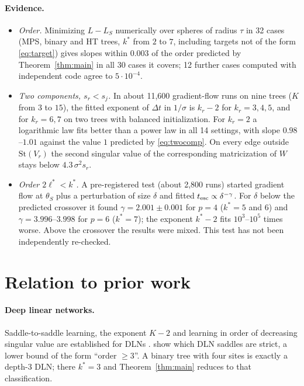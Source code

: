 \documentclass[11pt]{article}
\theoremstyle{definition}
\newcommand{\St}{\mathrm{St}}
\begin{document}
\paragraph{Evidence.}
\begin{itemize}
\item \emph{Order.} Minimizing $L-L_S$ numerically over spheres of radius $\tau$ in 32 cases (MPS, binary and HT trees,
$k^*$ from $2$ to $7$, including targets not of the form \eqref{eq:target}) gives slopes within $0.003$ of the order
predicted by Theorem~\ref{thm:main} in all 30 cases it covers; 12 further cases computed with independent code agree to
$5\cdot10^{-4}$.
\item \emph{Two components, $s_r<s_j$.} In about 11,600 gradient-flow runs on nine trees ($K$ from $3$ to $15$), the
fitted exponent of $\Delta t$ in $1/\sigma$ is $k_r-2$ for $k_r=3,4,5$, and for $k_r=6,7$ on two trees with
balanced initialization. For $k_r=2$ a logarithmic law fits better than a power law in all 14 settings, with slope
$0.98$--$1.01$ against the value $1$ predicted by \eqref{eq:twocomp}. On every edge outside $\St(V_r)$ the second
singular value of the corresponding matricization of $W$ stays below $4.3\,\sigma^2s_r$.
\item \emph{Order $2\ell^*<k^*$.} A pre-registered test (about 2,800 runs) started gradient flow at $\theta_S$ plus a
perturbation of size $\delta$ and fitted $t_{\rm esc}\propto\delta^{-\gamma}$. For $\delta$ below the predicted crossover it
found $\gamma=2.001\pm0.001$ for $p=4$ ($k^*=5$ and $6$) and $\gamma=3.996$--$3.998$ for $p=6$ ($k^*=7$); the exponent
$k^*-2$ fits $10^3$--$10^5$ times worse. Above the crossover the results were mixed. This test has not been
independently re-checked.
\end{itemize}

\section{Relation to prior work}\label{sec:prior}

\paragraph{Deep linear networks.} Saddle-to-saddle learning, the exponent $K-2$ and learning in order of decreasing
singular value are established for DLNs \citep{saxe2014exact,jacot2022saddletosaddle}. \citet[Thm~7]{achour2024loss}
show which DLN saddles are strict, a lower bound of the form ``order $\ge3$''. A binary tree with four sites is
exactly a depth-3 DLN; there $k^*=3$ and Theorem~\ref{thm:main} reduces to that classification.
\end{document}
